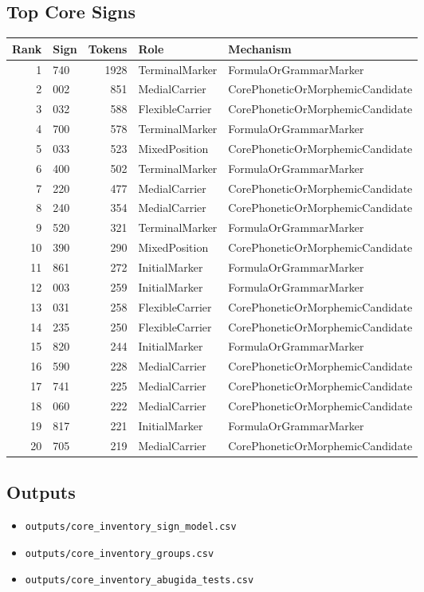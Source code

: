 ﻿\documentclass[11pt,a4paper]{article}
\begin{document}
\subsection*{Top Core Signs}
\begin{center}
\begin{tabular}{rlrll}
\toprule
\textbf{Rank} & \textbf{Sign} & \textbf{Tokens} & \textbf{Role} & \textbf{Mechanism} \\
\midrule
1 & 740 & 1928 & TerminalMarker & FormulaOrGrammarMarker \\
2 & 002 & 851 & MedialCarrier & CorePhoneticOrMorphemicCandidate \\
3 & 032 & 588 & FlexibleCarrier & CorePhoneticOrMorphemicCandidate \\
4 & 700 & 578 & TerminalMarker & FormulaOrGrammarMarker \\
5 & 033 & 523 & MixedPosition & CorePhoneticOrMorphemicCandidate \\
6 & 400 & 502 & TerminalMarker & FormulaOrGrammarMarker \\
7 & 220 & 477 & MedialCarrier & CorePhoneticOrMorphemicCandidate \\
8 & 240 & 354 & MedialCarrier & CorePhoneticOrMorphemicCandidate \\
9 & 520 & 321 & TerminalMarker & FormulaOrGrammarMarker \\
10 & 390 & 290 & MixedPosition & CorePhoneticOrMorphemicCandidate \\
11 & 861 & 272 & InitialMarker & FormulaOrGrammarMarker \\
12 & 003 & 259 & InitialMarker & FormulaOrGrammarMarker \\
13 & 031 & 258 & FlexibleCarrier & CorePhoneticOrMorphemicCandidate \\
14 & 235 & 250 & FlexibleCarrier & CorePhoneticOrMorphemicCandidate \\
15 & 820 & 244 & InitialMarker & FormulaOrGrammarMarker \\
16 & 590 & 228 & MedialCarrier & CorePhoneticOrMorphemicCandidate \\
17 & 741 & 225 & MedialCarrier & CorePhoneticOrMorphemicCandidate \\
18 & 060 & 222 & MedialCarrier & CorePhoneticOrMorphemicCandidate \\
19 & 817 & 221 & InitialMarker & FormulaOrGrammarMarker \\
20 & 705 & 219 & MedialCarrier & CorePhoneticOrMorphemicCandidate \\
\bottomrule
\end{tabular}
\end{center}
\subsection*{Outputs}
\begin{itemize}
\item \texttt{outputs/core\_inventory\_sign\_model.csv}
\item \texttt{outputs/core\_inventory\_groups.csv}
\item \texttt{outputs/core\_inventory\_abugida\_tests.csv}
\end{itemize}
\end{document}
